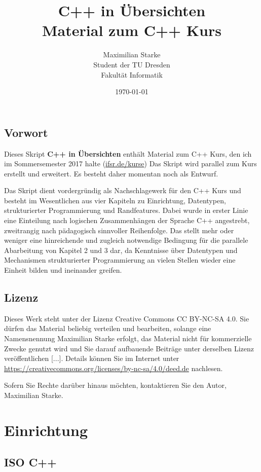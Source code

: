 \documentclass[a4paper]{report}
\title{C++ in Übersichten \\ \medskip \large Material zum C++ Kurs}
\author{Maximilian Starke \\ Student der TU Dresden \\ Fakultät Informatik}
\date{\today}
\begin{document}
\maketitle

\section*{Vorwort}
Dieses Skript \textbf{C++ in Übersichten} enthält Material zum C++ Kurs, den ich im Sommersemester 2017 halte (\url{ifsr.de/kurse})
Das Skript wird parallel zum Kurs erstellt und erweitert. Es besteht daher momentan noch als Entwurf.

Das Skript dient vordergründig als Nachschlagewerk für den C++ Kurs und besteht im Wesentlichen aus vier Kapiteln zu Einrichtung, Datentypen, strukturierter Programmierung und Randfeatures. Dabei wurde in erster Linie eine Einteilung nach logischen Zusammenhängen der Sprache C++ angestrebt, zweitrangig nach pädagogisch sinnvoller Reihenfolge. Das stellt mehr oder weniger eine hinreichende und zugleich notwendige Bedingung für die parallele Abarbeitung von Kapitel 2 und 3 dar, da Kenntnisse über Datentypen und Mechanismen strukturierter Programmierung an vielen Stellen wieder eine Einheit bilden und ineinander greifen.


\section*{Lizenz}
Dieses Werk steht unter der Lizenz Creative Commons CC BY-NC-SA 4.0. Sie dürfen das Material beliebig verteilen und bearbeiten, solange eine Namensnennung \textcopyright \vspace{0.3ex} Maximilian Starke erfolgt, das Material nicht für kommerzielle Zwecke genutzt wird und Sie darauf aufbauende Beiträge unter derselben Lizenz veröffentlichen [...]. Details können Sie im Internet unter \url{https://creativecommons.org/licenses/by-nc-sa/4.0/deed.de} nachlesen.

Sofern Sie Rechte darüber hinaus möchten, kontaktieren Sie den Autor, Maximilian Starke.
\tableofcontents

\chapter{Einrichtung}

\section{ISO C++}
\end{document}
